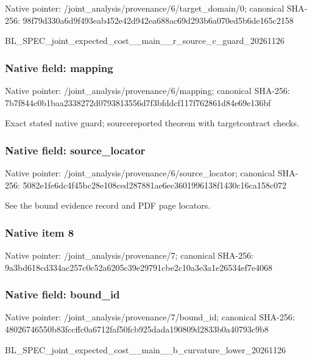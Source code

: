 \documentclass[10pt,a4paper]{article}
\begin{document}
Native pointer: /joint\_analysis/provenan\allowbreak{}ce/6/target\_domain/0; canonical SHA-256: 98f79d330a6d9f493eab452e\allowbreak{}42d942ea688ac69d293b6a07\allowbreak{}0ed5b6de165c2158


BL\_SPEC\_joint\_expected\_c\allowbreak{}ost\_\_main\_\_r\_source\_c\_gu\allowbreak{}ard\_20261126


\subsubsection{Native field: mapping}


Native pointer: /joint\_analysis/provenance/6/mapping; canonical SHA-256: 7b7f844c0b1baa2338272d07\allowbreak{}93813556d7f3bfddcf117f76\allowbreak{}2861d84e69e136bf


Exact stated native guard; sourcereported theorem with targetcontract checks.


\subsubsection{Native field: source\_locator}


Native pointer: /joint\_analysis/provenan\allowbreak{}ce/6/source\_locator; canonical SHA-256: 5082e1fe6dc4f45bc28e108c\allowbreak{}ed287881ae6ec3601996138f\allowbreak{}1430c16ca158c072


See the bound evidence record and PDF page locators.


\subsubsection{Native item 8}


Native pointer: /joint\_analysis/provenance/7; canonical SHA-256: 9a3bd618cd334ac257c0c52a\allowbreak{}6205c39e29791cbe2c10a3e3\allowbreak{}a1e26534ef7e4068



\subsubsection{Native field: bound\_id}


Native pointer: /joint\_analysis/provenance/7/bound\_id; canonical SHA-256: 48026746550b83fccffc0a67\allowbreak{}12faf50fcb925dada190809d\allowbreak{}2833b0a40793c9b8


BL\_SPEC\_joint\_expected\_c\allowbreak{}ost\_\_main\_\_b\_curvature\_l\allowbreak{}ower\_20261126
\end{document}
